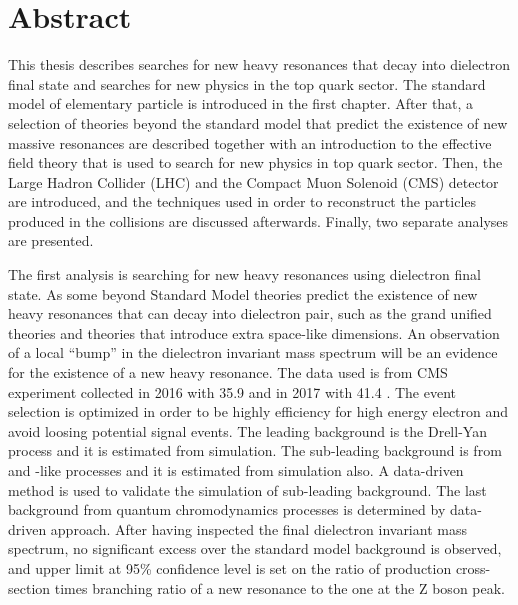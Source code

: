 

\clearpage
\section*{Abstract}

This thesis describes searches for new heavy resonances that decay into dielectron final state and searches for new physics in the top quark sector. The standard model of elementary particle is introduced in the first chapter. After that, a selection of theories beyond the standard model that predict the existence of new massive resonances are described together with an introduction to the effective field theory that is used to search for new physics in top quark sector. Then, the Large Hadron Collider (LHC) and the Compact Muon Solenoid (CMS) detector are introduced, and the techniques used in order to reconstruct the particles produced in the collisions are discussed afterwards. Finally, two separate analyses are presented.

The first analysis is searching for new heavy resonances using dielectron final state. As some beyond Standard Model theories predict the existence of new heavy resonances that can decay into dielectron pair, such as the grand unified theories and theories that introduce extra space-like dimensions. An observation of a local ``bump'' in the dielectron invariant mass spectrum will be an evidence for the existence of a new heavy resonance. The data used is from CMS experiment collected in 2016 with 35.9 \fbinv and in 2017 with 41.4 \fbinv. The event selection is optimized in order to be highly efficiency for high energy electron and avoid loosing potential signal events. The leading background is the Drell-Yan process and it is estimated from simulation. The sub-leading background is from \ttbar and \ttbar-like processes and it is estimated from simulation also. A data-driven method is used to validate the simulation of sub-leading background. The last background from quantum chromodynamics processes is determined by data-driven approach. After having inspected the final dielectron invariant mass spectrum, no significant excess over the standard model background is observed, and upper limit at 95\% confidence level is set on the ratio of production cross-section times branching ratio of a new resonance to the one at the Z boson peak.

